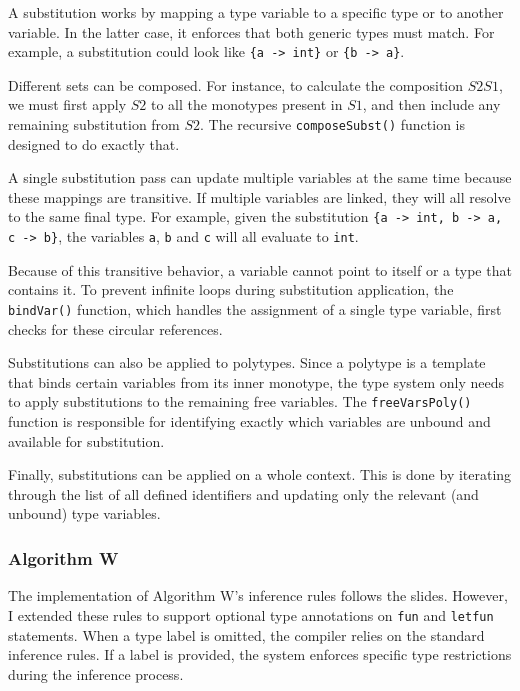 \documentclass[12pt]{article}
\newcommand{\Code}[1]{\texttt{#1}}
\begin{document}
A substitution works by mapping a type variable to a specific type or to another
variable. In the latter case, it enforces that both generic types must match.
For example, a substitution could look like \Code{\{a -> int\}} or \Code{\{b ->
a\}}.

Different sets can be composed. For instance, to calculate the composition
$S2S1$, we must first apply $S2$ to all the monotypes present in $S1$, and then
include any remaining substitution from $S2$. The recursive
\Code{composeSubst()} function is designed to do exactly that.

A single substitution pass can update multiple variables at the same time
because these mappings are transitive. If multiple variables are linked, they
will all resolve to the same final type. For example, given the substitution
\Code{\{a -> int, b -> a, c -> b\}}, the variables \Code{a}, \Code{b} and
\Code{c} will all evaluate to \Code{int}.

Because of this transitive behavior, a variable cannot point to itself or a type
that contains it. To prevent infinite loops during substitution application, the
\Code{bindVar()} function, which handles the assignment of a single type
variable, first checks for these circular references.

Substitutions can also be applied to polytypes. Since a polytype is a template
that binds certain variables from its inner monotype, the type system only needs
to apply substitutions to the remaining free variables. The
\Code{freeVarsPoly()} function is responsible for identifying exactly which
variables are unbound and available for substitution.

Finally, substitutions can be applied on a whole context. This is done by
iterating through the list of all defined identifiers and updating only the
relevant (and unbound) type variables.

\subsubsection{Algorithm W}

The implementation of Algorithm W's inference rules follows the slides. However,
I extended these rules to support optional type annotations on \texttt{fun} and
\texttt{letfun} statements. When a type label is omitted, the compiler relies on
the standard inference rules. If a label is provided, the system enforces
specific type restrictions during the inference process.
\end{document}
